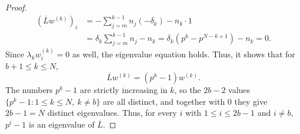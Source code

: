 \documentclass[10pt,a4paper]{amsart}
\begin{document}
\begin{proof}
\begin{align*}
		(\overline{L}w^{(k)})_i
		&= -\sum_{j=m}^{k-1} n_j(-\delta_k) - n_k\cdot1\\
		&= \delta_k\sum_{j=m}^{k-1}n_j - n_k
		= \delta_k(p^k-p^{N-k+1}) - n_k
		= 0.
	\end{align*}
	Since $\lambda_k w^{(k)}_i=0$
	as well, the eigenvalue equation holds. Thus,  it shows that for $b+1\le k\le N$,
	\[
	\overline{L}w^{(k)} = (p^k-1)w^{(k)}.
	\]
	The numbers $p^k-1$ are strictly increasing in $k$, so the
	$2b-2$ values $\{p^k-1:1\le k\le N,\ k\ne b\}$ are all distinct, and
	together with $0$ they give $2b-1=N$ distinct eigenvalues. Thus, for every $i$ with $1\le i\le 2b-1$ and $i\neq b$,
	$p^i-1$ is an eigenvalue of $\overline{L}$.
\end{proof}
\end{document}
